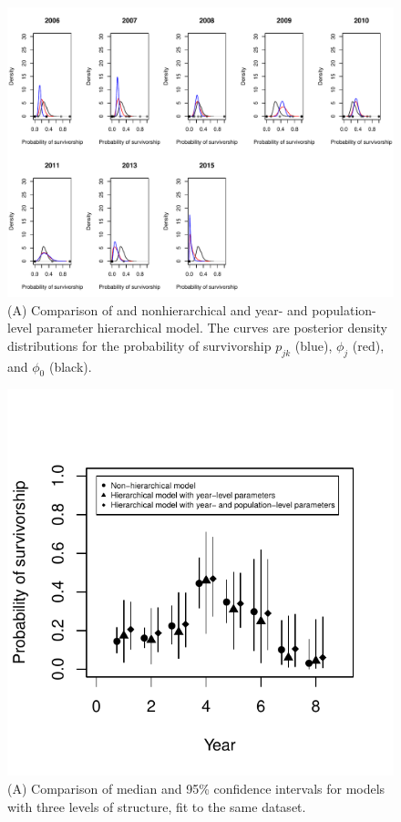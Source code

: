 \documentclass[12pt, oneside, titlepage]{article}   	%
\begin{document}
\begin{figure}[h]
   \centering
       \includegraphics[page=1,width=.9\textwidth]{../../figures/appendix-x-hierarchyPosteriors_nh_hyearpop}  
    \caption{ (A) Comparison of and nonhierarchical and year- and population-level parameter hierarchical model.  The curves are posterior density distributions for the probability of survivorship $p_{jk}$ (blue), $\phi_j$ (red), and $\phi_0$ (black).  }
 \label{fig:hierarchyPosteriors_nh_hyearpop}
\end{figure}


 \begin{figure}[h]
   \centering
       \includegraphics[page=1,width=.9\textwidth]{../../figures/appendix-x-hierarchyPosteriorsSummary}  
    \caption{ (A) Comparison of median and 95\% confidence intervals for models with three levels of structure, fit to the same dataset.   }
 \label{fig:hierarchyPosteriorsSummary}
\end{figure}
\end{document}
